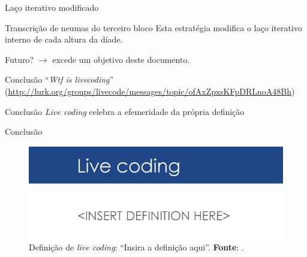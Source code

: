 \documentclass[aspectratio=169]{beamer}
\begin{document}
\begin{frame}{Laço iterativo modificado}
\sorensennove
\end{frame}

\begin{frame}{Transcrição de neumas do terceiro bloco}
Esta estratégia modifica o laço iterativo interno de cada altura da díade.
\end{frame}


\begin{frame}{Futuro?}
 $\rightarrow$ excede um objetivo deste documento.
\end{frame}

\begin{frame}{Conclusão}
``\emph{Wtf is livecoding}'' (\url{http://lurk.org/groups/livecode/messages/topic/ofAxZpxsKFpDRLnoA48Bh})
\end{frame}

\begin{frame}{Conclusão}
\emph{Live coding} celebra a efemeridade da própria definição
\end{frame}

\begin{frame}{Conclusão}
  \begin{figure}[h]
    \centering
    \includegraphics[scale=0.5]{imagens/live_coding_def.png}
    \caption{Definição de \emph{live coding}: ``Insira a definição aqui''. \textbf{Fonte}: .}
    \label{fig:live_coding_def}
  \end{figure}
  \end{frame}	
 
\end{document}
